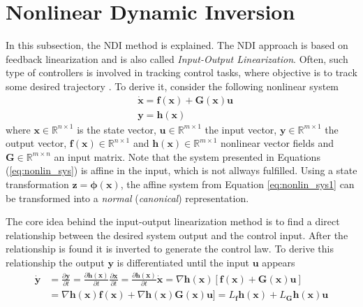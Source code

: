 \documentclass[11pt, a4paper, twoside]{report}
\begin{document}
\section{Nonlinear Dynamic Inversion} \label{sec:ndi}

In this subsection, the \acrfull{NDI} method is explained. The \acrshort{NDI} approach is based on feedback linearization and is also called \textit{Input-Output Linearization}. Often, such type of controllers is involved in tracking control tasks, where objective is to track some desired trajectory \cite{Slotine}. To derive it, consider the following nonlinear system
\begin{subequations}
	\begin{align}
		&\bm{\dot{x}} = \bm{f}(\bm{x}) + \bm{G}(\bm{x})\bm{u} \label{eq:nonlin_sys1} \\
		&\bm{y} = \bm{h}(\bm{x}) \label{eq:nonlin_sys2}
	\end{align}
	\label{eq:nonlin_sys}
\end{subequations}
\hspace{-5pt}where $\bm{x} \in \mathbb{R}^{n \times 1}$ is the state vector, $\bm{u} \in \mathbb{R}^{m \times 1}$ the input vector, $\bm{y} \in \mathbb{R}^{m \times 1}$ the output vector, $\bm{f}(\bm{x}) \in \mathbb{R}^{n \times 1}$ and $\bm{h}(\bm{x}) \in \mathbb{R}^{m \times 1}$ nonlinear vector fields and $\bm{G} \in \mathbb{R}^{m \times n}$ an input matrix. Note that the system presented in Equations (\ref{eq:nonlin_sys}) is affine in the input, which is not allways fulfilled. Using a state transformation $\bm{z} = \bm{\phi}(\bm{x})$, the affine system from Equation \ref{eq:nonlin_sys1} can be transformed into a \textit{normal} (\textit{canonical}) representation. 

The core idea behind the input-output linearization method is to find a direct relationship between the desired system output and the control input. After the relationship is found it is inverted to generate the control law. To derive this relationship the output $\bm{y}$ is differentiated until the input $\bm{u}$ appears
\begin{equation}
	\begin{split}
		\bm{\dot{y}} &=  \frac{\partial\bm{y}}{\partial t} = \frac{\partial\bm{h}(\bm{x})}{\partial t} \frac{\partial\bm{x}}{\partial t} = \frac{\partial\bm{h}(\bm{x})}{\partial t} \dot{\bm{x}} = \nabla\bm{h}(\bm{x}) [\bm{f}(\bm{x}) + \bm{G}(\bm{x})\bm{u}] \\
		&= \nabla\bm{h}(\bm{x}) \bm{f}(\bm{x}) + \nabla\bm{h}(\bm{x}) \bm{G}(\bm{x})\bm{u}] = L_{\bm{f}} \bm{h}(\bm{x}) + L_{\bm{G}} \bm{h}(\bm{x}) \bm{u} 
		\label{eq:dy}
	\end{split}
\end{equation}
\end{document}
